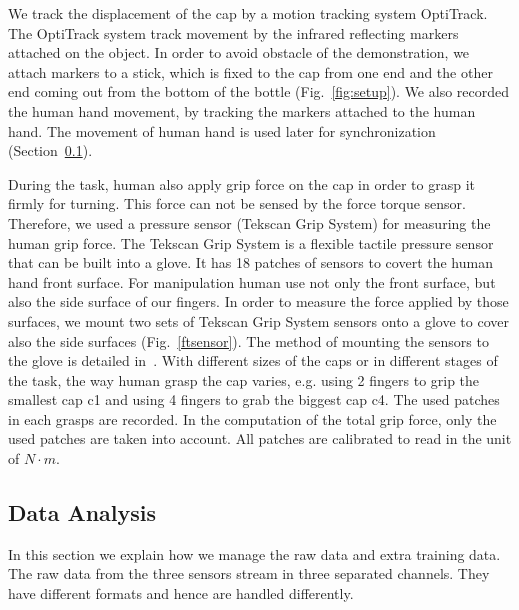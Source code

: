 We track the displacement of the cap by a motion tracking system OptiTrack. The OptiTrack system track movement by the infrared reflecting markers attached on the object. In order to avoid obstacle of the demonstration, we attach markers to a stick, which is fixed to the cap from one end and the other end coming out from the bottom of the bottle (Fig.~\ref{fig:setup}). We also recorded the human hand movement, by tracking the markers attached to the human hand. The movement of human hand is used later for synchronization (Section~\ref{dataanalysis}).

During the task, human also apply grip force on the cap in order to grasp it firmly for turning. This force can not be sensed by the force torque sensor. Therefore, we used a pressure sensor (Tekscan Grip System) for measuring the human grip force. The Tekscan Grip System is a flexible tactile pressure sensor that can be built into a glove. It has 18 patches of sensors to covert the human hand front surface. For manipulation human use not only the front surface, but also the side surface of our fingers. In order to measure the force applied by those surfaces, we mount two sets of Tekscan Grip System sensors onto a glove to cover also the side surfaces (Fig.~\ref{ftsensor}). The method of mounting the sensors to the glove is detailed in~\cite{deSouza2014}. With different sizes of the caps or in different stages of the task, the way human grasp the cap varies, e.g. using 2 fingers to grip the smallest cap c1 and using 4 fingers to grab the biggest cap c4. The used patches in each grasps are recorded. In the computation of the total grip force, only the used patches are taken into account. All patches are calibrated to read in the unit of $N{\cdot}m$.


\subsection{Data Analysis}
\label{dataanalysis}
In this section we explain how we manage the raw data and extra training data.
The raw data from the three sensors stream in three separated channels. They have different formats and hence are handled differently.


